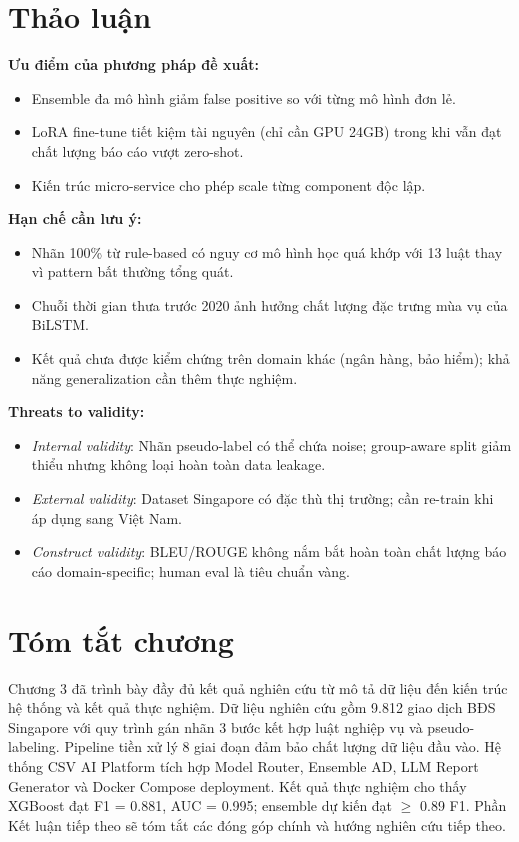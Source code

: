 \section{Thảo luận}

\textbf{Ưu điểm của phương pháp đề xuất:}
\begin{itemize}
  \item Ensemble đa mô hình giảm false positive so với từng mô hình đơn lẻ.
  \item LoRA fine-tune tiết kiệm tài nguyên (chỉ cần GPU 24GB) trong khi vẫn đạt chất lượng báo cáo vượt zero-shot.
  \item Kiến trúc micro-service cho phép scale từng component độc lập.
\end{itemize}

\textbf{Hạn chế cần lưu ý:}
\begin{itemize}
  \item Nhãn 100\% từ rule-based có nguy cơ mô hình học quá khớp với 13 luật thay vì pattern bất thường tổng quát.
  \item Chuỗi thời gian thưa trước 2020 ảnh hưởng chất lượng đặc trưng mùa vụ của BiLSTM.
  \item Kết quả chưa được kiểm chứng trên domain khác (ngân hàng, bảo hiểm); khả năng generalization cần thêm thực nghiệm.
\end{itemize}

\textbf{Threats to validity:}
\begin{itemize}
  \item \textit{Internal validity}: Nhãn pseudo-label có thể chứa noise; group-aware split giảm thiểu nhưng không loại hoàn toàn data leakage.
  \item \textit{External validity}: Dataset Singapore có đặc thù thị trường; cần re-train khi áp dụng sang Việt Nam.
  \item \textit{Construct validity}: BLEU/ROUGE không nắm bắt hoàn toàn chất lượng báo cáo domain-specific; human eval là tiêu chuẩn vàng.
\end{itemize}

\section{Tóm tắt chương}

Chương 3 đã trình bày đầy đủ kết quả nghiên cứu từ mô tả dữ liệu đến kiến trúc hệ thống và kết quả thực nghiệm. Dữ liệu nghiên cứu gồm 9.812 giao dịch BĐS Singapore với quy trình gán nhãn 3 bước kết hợp luật nghiệp vụ và pseudo-labeling. Pipeline tiền xử lý 8 giai đoạn đảm bảo chất lượng dữ liệu đầu vào. Hệ thống CSV AI Platform tích hợp Model Router, Ensemble AD, LLM Report Generator và Docker Compose deployment. Kết quả thực nghiệm cho thấy XGBoost đạt F1 = 0.881, AUC = 0.995; ensemble dự kiến đạt $\geq$ 0.89 F1. Phần Kết luận tiếp theo sẽ tóm tắt các đóng góp chính và hướng nghiên cứu tiếp theo.
